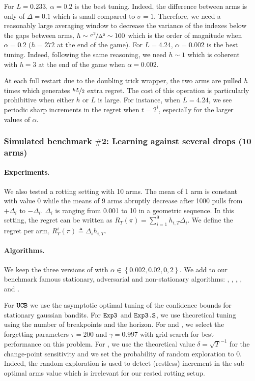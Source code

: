 For $L=0.233$, $\alpha= 0.2$ is the best tuning. Indeed, the difference between arms is only of $\Delta = 0.1$ which is small compared to $\sigma =1$. Therefore, we need a reasonably large averaging window to decrease the variance of the indexes below the gaps between arms, \ie $h \sim \nicefrac{\sigma^2}{\Delta^2} \sim 100$ which is the order of magnitude when $\alpha = 0.2$ ($h=272$ at the end of the game). For $L = 4.24$, $\alpha=0.002$ is the best tuning. Indeed, following the same reasoning, we need $h \sim 1$ which is coherent with $h=3$ at the end of the game when $\alpha = 0.002$.

At each full restart due to the doubling trick wrapper, the two arms are pulled $h$ times which generates $\nicefrac{hL}{2}$ extra regret. The cost of this operation is particularly prohibitive when either $h$ or $L$ is large. For instance, when $L=4.24$, we see periodic sharp increments in the regret when $t=2^i$, especially for the larger values of $\alpha$.


\subsubsection{Simulated benchmark $\#$2: Learning against several drops (10 arms)}
\paragraph{Experiments.} We also tested a rotting setting with 10 arms. The mean of 1 arm is constant with value 0 while the means of 9 arms abruptly decrease after 1000 pulls from $+\Delta_i$ to $-\Delta_i$. $\Delta_i$ is ranging from 0.001 to 10 in a geometric sequence. In this setting, the regret can be written as $R_T(\pi) = \sum_{i=1}^9 h_{i,T}\Delta_i$. We define the regret per arm, $R_T^i(\pi) \triangleq \Delta_i h_{i,T}$.

\paragraph{Algorithms.} We keep the three versions of \wSWA with $\alpha \in \left\{ 0.002, 0.02, 0,2\right\}$. We add to our benchmark famous stationary, adversarial and non-stationary algorithms: \UCB \citep{lai1985asymptotically}, \EXP, \EXPS \citep{auer2002nonstochastic}, \DUCB, \SWUCB \citep{garivier2011upper-confidence-bound} and \GLRUCB \citep{besson2019generalized}. 

For $\texttt{UCB}$ we use the asymptotic optimal tuning of the confidence bounds for stationary gaussian bandits. For $\texttt{Exp3}$ and $\normalfont \texttt{Exp3.S}$, we use theoretical tuning using the number of breakpoints and the horizon. For \SWUCB and \DUCB, we select the forgetting parameters $\tau=200$ and $\gamma = 0.997$ with grid-search for best performance on this problem. For \GLRUCB, we use the theoretical value $\delta = \sqrt{T}^{-1}$ for the change-point sensitivity and we set the probability of random exploration to $0$. Indeed, the random exploration is used to detect (restless) increment in the sub-optimal arms value which is irrelevant for our rested rotting setup.


